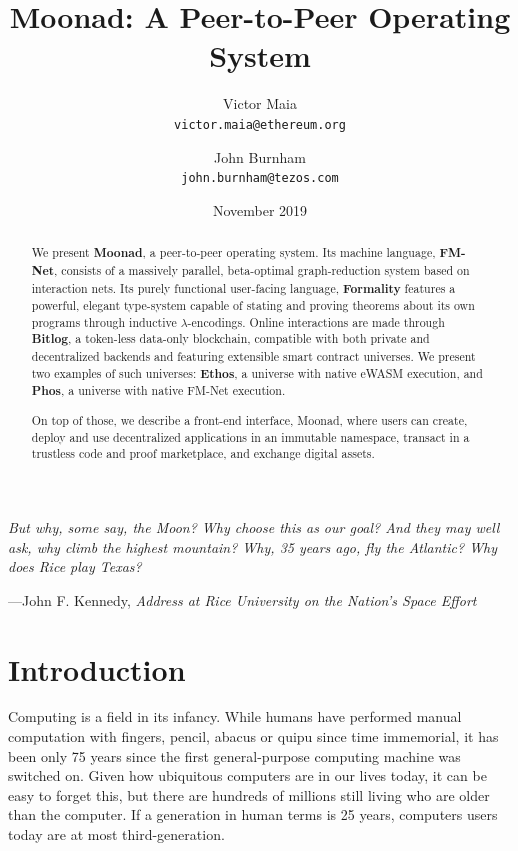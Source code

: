 \documentclass{article}
\theoremstyle{definition}
\theoremstyle{theorem}
\begin{document}
\title{Moonad: A Peer-to-Peer Operating System}
\author{
  Victor Maia\\
  \texttt{victor.maia@ethereum.org}
  \and
  John Burnham\\
  \texttt{john.burnham@tezos.com}
}
\date{November 2019}
\maketitle

\setlength{}
\setlength\epigraphrule{0pt}

\epigraph{\itshape But why, some say, the Moon? Why choose this as our goal? And
they may well ask, why climb the highest mountain? Why, 35 years ago, fly the
Atlantic? Why does Rice play Texas?}{---John F. Kennedy, \textit{Address at
Rice University on the Nation's Space Effort}}

\begin{abstract}
We present \textbf{Moonad}, a peer-to-peer operating system. Its machine
language, \textbf{FM-Net}, consists of a massively parallel, beta-optimal
graph-reduction system based on interaction nets. Its purely functional
user-facing language, \textbf{Formality} features a powerful, elegant
type-system capable of stating and proving theorems about its own programs
through inductive $\lambda$-encodings.  Online interactions are made through
\textbf{Bitlog}, a token-less data-only blockchain, compatible with both private
and decentralized backends and featuring extensible smart contract universes. We
present two examples of such universes: \textbf{Ethos}, a universe with native
eWASM execution, and \textbf{Phos}, a universe with native FM-Net execution.

On top of those, we describe a front-end interface, Moonad, where users
can create, deploy and use decentralized applications in an immutable namespace,
transact in a trustless code and proof marketplace, and exchange digital assets.
\end{abstract}

\newpage
\tableofcontents
\newpage

\section{Introduction} 

Computing is a field in its infancy. While humans have performed manual
computation with fingers, pencil, abacus or quipu since time immemorial, it has
been only 75 years since the first general-purpose computing machine was
switched on. Given how ubiquitous computers are in our lives today, it can be
easy to forget this, but there are hundreds of millions still living who are
older than the computer. If a generation in human terms is 25 years, computers
users today are at most third-generation.
\end{document}
